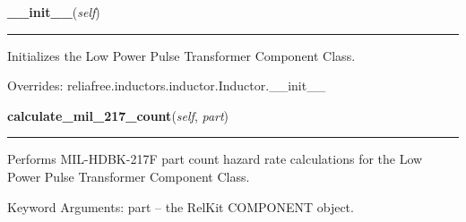 \hspace{.8\funcindent}\begin{boxedminipage}{\funcwidth}

    \raggedright \textbf{\_\_init\_\_}(\textit{self})

    \vspace{-1.5ex}

    \rule{\textwidth}{0.5\fboxrule}
\setlength{\parskip}{2ex}
    Initializes the Low Power Pulse Transformer Component Class.

\setlength{\parskip}{1ex}
      Overrides: reliafree.inductors.inductor.Inductor.\_\_init\_\_

    \end{boxedminipage}

    \label{reliafree:inductors:transformer:LowPowerPulse:calculate_mil_217_count}

    \vspace{0.5ex}

\hspace{.8\funcindent}\begin{boxedminipage}{\funcwidth}

    \raggedright \textbf{calculate\_mil\_217\_count}(\textit{self}, \textit{part})

    \vspace{-1.5ex}

    \rule{\textwidth}{0.5\fboxrule}
\setlength{\parskip}{2ex}
    Performs MIL-HDBK-217F part count hazard rate calculations for the Low 
    Power Pulse Transformer Component Class.

    Keyword Arguments: part -- the RelKit COMPONENT object.

\setlength{\parskip}{1ex}
    \end{boxedminipage}

    \label{reliafree:inductors:transformer:LowPowerPulse:calculate_mil_217_stress}

    \vspace{0.5ex}

